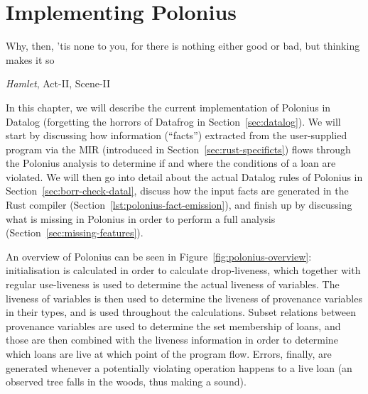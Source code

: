 \documentclass[11pt,a4paper,twoside,openany]{report}
\begin{document}
\chapter{Implementing Polonius}\label{cha:implementation}

\epigraph{Why, then, 'tis none to you, for there is nothing either good or bad,
  but thinking makes it so}%
{\textit{Hamlet}, Act-II, Scene-II}

In this chapter, we will describe the current implementation of Polonius in
Datalog (forgetting the horrors of Datafrog in Section~\ref{sec:datalog}). We
will start by discussing how information (``facts'') extracted from the
user-supplied program via the MIR (introduced in
Section~\ref{sec:rust-specificts}) flows through the Polonius analysis to
determine if and where the conditions of a loan are violated. We will then go
into detail about the actual Datalog rules of Polonius in
Section~\ref{sec:borr-check-datal}, discuss how the input facts are generated in
the Rust compiler (Section~\ref{lst:polonius-fact-emission}), and finish up by
discussing what is missing in Polonius in order to perform a full analysis
(Section~\ref{sec:missing-features}).

An overview of Polonius can be seen in Figure~\ref{fig:polonius-overview}:
initialisation is calculated in order to calculate drop-liveness, which together
with regular use-liveness is used to determine the actual liveness of variables.
The liveness of variables is then used to determine the liveness of provenance
variables in their types, and is used throughout the calculations. Subset
relations between provenance variables are used to determine the set membership
of loans, and those are then combined with the liveness information in order to
determine which loans are live at which point of the program flow. Errors,
finally, are generated whenever a potentially violating operation happens to a
live loan (an observed tree falls in the woods, thus making a sound).
\end{document}
